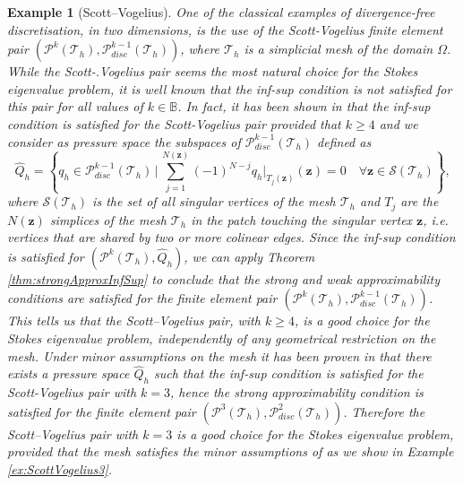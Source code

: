 \documentclass[USenglish]{article}
\theoremstyle{dgthm}
\theoremstyle{dgdef}
\newtheorem{example}{Example}
\let\vec\bm
\begin{document}
\begin{example}[Scott--Vogelius]
  One of the classical examples of divergence-free discretisation, in two dimensions, is the use of the Scott-Vogelius finite element pair $\left(\mathcal{P}^{k}(\mathcal{T}_h),\mathcal{P}^{k-1}_{disc}(\mathcal{T}_h)\right)$, where $\mathcal{T}_h$ is a simplicial mesh of the domain $\Omega$.
  While the Scott-.Vogelius pair seems the most natural choice for the Stokes eigenvalue problem, it is well known that the inf-sup condition is not satisfied for this pair for all values of $k\in\mathbb{B}$.
  In fact, it has been shown in \cite{GuzmanScott,ScottVogelius} that the inf-sup condition is satisfied for the Scott-Vogelius pair provided that $k\geq 4$ and we consider as pressure space the subspaces of $\mathcal{P}^{k-1}_{disc}(\mathcal{T}_h)$ defined as
  \begin{equation}
    \hat{Q}_h = \left\{q_h\in \mathcal{P}^{k-1}_{disc}(\mathcal{T}_h)\,|\, \sum_{j=1}^{N(\vec{z})} (-1)^{N-j} q_h\big|_{T_j(\vec{z})}(\vec{z}) = 0 \quad \forall \vec{z}\in \mathcal{S}(\mathcal{T}_h)\right\},
  \end{equation}
  where $\mathcal{S}(\mathcal{T}_h)$ is the set of all singular vertices of the mesh $\mathcal{T}_h$ and $T_j$ are the $N(\vec{z})$ simplices of the mesh $\mathcal{T}_h$ in the patch touching the singular vertex $\vec{z}$, i.e. vertices that are shared by two or more colinear edges. 
  Since the inf-sup condition is satisfied for $\left(\mathcal{P}^{k}(\mathcal{T}_h),\hat{Q}_h\right)$, we can apply Theorem \ref{thm:strongApproxInfSup} to conclude that the strong and weak approximability conditions are satisfied for the finite element pair $\left(\mathcal{P}^{k}(\mathcal{T}_h),\mathcal{P}^{k-1}_{disc}(\mathcal{T}_h)\right)$.
  This tells us that the Scott--Vogelius pair, with $k\geq 4$, is a good choice for the Stokes eigenvalue problem, independently of any geometrical restriction on the mesh.
  Under minor assumptions on the mesh it has been proven in \cite{GuzmanScott2} that there exists a pressure space $\hat{Q}_h$ such that the inf-sup condition is satisfied for the Scott-Vogelius pair with $k=3$, hence the strong approximability condition is satisfied for the finite element pair $\left(\mathcal{P}^{3}(\mathcal{T}_h),\mathcal{P}^{2}_{disc}(\mathcal{T}_h)\right)$.
  Therefore the Scott--Vogelius pair with $k=3$ is a good choice for the Stokes eigenvalue problem, provided that the mesh satisfies the minor assumptions of \cite{GuzmanScott2} as we show in Example \ref{ex:ScottVogelius3}.
\end{example}
\end{document}

